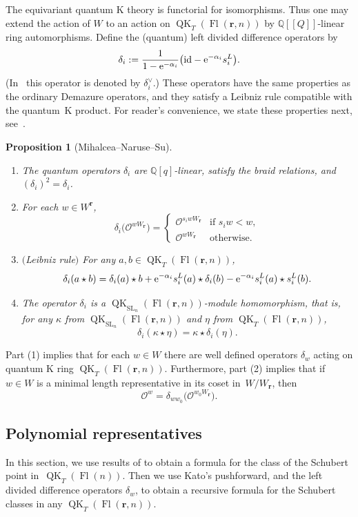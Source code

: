 \documentclass[pdftex]{sigma}
\numberwithin{equation}{section}
\newtheorem{Proposition}[Theorem]{Proposition}
\theoremstyle{definition}
\DeclareMathOperator{\SL}{SL}
\DeclareMathOperator{\Fl}{Fl}
\DeclareMathOperator{\QK}{QK}
\newcommand{\bfr}{{\mathbf r}}
\newcommand{\Q}{{\mathbb Q}}
\newcommand{\cO}{{\mathcal O}}
\newcommand{\id}{\text{id}}
\begin{document}
The equivariant quantum K theory is functorial for isomorphisms. Thus
one may extend the action of $W$ to an action on $\QK_T(\Fl(\bfr,n))$
by $\mathbb{Q}[\![Q]\!]$-linear ring automorphisms.
Define the (quantum) left divided difference operators by
\begin{equation*}%
 \delta_i := \frac{1}{1- {\rm e}^{-\alpha_i}}\bigl(\id - {\rm e}^{-\alpha_i} s_i^L\bigr) .\end{equation*}
\big(In~\cite[equation~(13)]{Mihalcea2022Left} this operator is denoted by $\delta_i^\vee$.\big)
These operators have the same properties as the ordinary Demazure operators,
and they satisfy a Leibniz rule compatible with the quantum~K product.
For reader's convenience, we state these properties next,
see~\cite[Proposition~8.3]{Mihalcea2022Left}.
\begin{Proposition}[Mihalcea--Naruse--Su]\label{prop:QKDem} \quad
 \begin{enumerate}\itemsep=0pt
 \item[$1.$] The quantum operators $\delta_i$ are $\Q[q]$-linear, satisfy the braid relations, and $(\delta_i)^2= \delta_i$.
 \item[$2.$] For each $w \in W^\bfr$,
 \[
 \delta_i \bigl(\cO^{wW_\bfr}\bigr)= \begin{cases} \cO^{s_i w W_\bfr} & \textrm{if } s_i w < w, \\ \cO^{wW_\bfr} & \textrm{otherwise} . \end{cases}
 \]
 \item[$3.$] $($Leibniz rule$)$ For any $a, b \in \QK_T(\Fl(\bfr,n))$,
 \[
 \delta_i(a \star b) = \delta_i(a) \star b + {\rm e}^{-\alpha_i} s_i^L(a) \star \delta_i(b) - {\rm e}^{-\alpha_i} s_i^L(a) \star s_i^L(b) .
 \]
 \item[$4.$] The operator $\delta_i$ is a $\QK_{\SL_n}(\Fl(\bfr,n))$-module homomorphism, that is, for any $\kappa$ from $\QK_{\SL_n}(\Fl(\bfr,n))$ and $\eta$ from $\QK_T(\Fl(\bfr,n))$,
\[ \delta_i(\kappa \star \eta) = \kappa \star \delta_i(\eta) . \]
 \end{enumerate}
\end{Proposition}

Part (1) implies that for each $w \in W$ there are well defined operators $\delta_w$ acting on
quantum K ring $\QK_T(\Fl(\bfr,n))$. Furthermore, part (2) implies that if $w \in W$ is a minimal length representative
in its coset in~$W/W_{\bfr}$, then
\[ \cO^w = \delta_{ww_0}\bigl(\cO^{w_0 W_{\bfr}}\bigr).\]

\subsection{Polynomial representatives} In this section, we use results of
\cite{maeno2023presentation} to obtain a formula for the class of the Schubert
point in~$\QK_T(\Fl(n))$. Then we use Kato's pushforward, and the left divided difference
operators $\delta_w$, to obtain a recursive formula for the Schubert classes in any $\QK_T(\Fl(\bfr,n))$.
\end{document}
